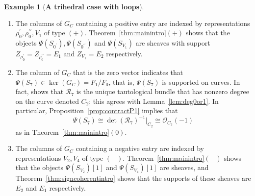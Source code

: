 \documentclass[11pt,reqno]{amsart}
\numberwithin{equation}{section}
\theoremstyle{definition}
\newtheorem{example}[theorem]{Example}
\newcommand{\0}{\operatorname{0}}
\begin{document}
\begin{example}[\textbf{A trihedral case with loops}]
 \begin{enumerate}
 \item[\ensuremath{(+)}] The columns of $G_C$ containing a positive entry are indexed by representations $\rho_{0}^\prime, \rho_{0}^{\prime\prime}, V_1$ of type \ensuremath{(+)}. Theorem~\ref{thm:mainintro}\ensuremath{(+)} shows that the objects $\Psi(S_{0^\prime}), \Psi(S_{0^{\prime\prime}})$ and $\Psi(S_{V_1})$ are sheaves with support $Z_{\rho_0^\prime}=Z_{\rho_0^{\prime\prime}}=E_1$ and $Z_{V_1}=E_2$ respectively.
 \item[\ensuremath{(0)}] The column of $G_C$ that is the zero vector indicates that $\Psi(S_7)\in \ker(G_C)=F_1/F_0$, that is, $\Psi(S_7)$ is supported on curves. In fact, \cite[Figure~11]{NolladeCelis21} shows that $\mathcal{R}_7$ is the unique tautological bundle that has nonzero degree on the curve denoted $C_2$; this agrees with Lemma~\ref{lem:deg0or1}. In particular, Proposition~\ref{prop:contractP1} implies that
 \[
 \Psi(S_7)\cong \det(\mathcal{R}_7)^{-1}\vert_{C_2}\cong\mathcal{O}_{C_2}(-1)
 \]
 as in  Theorem~\ref{thm:mainintro}\ensuremath{(0)}.
 \item[\ensuremath{(-)}]  The columns of $G_C$ containing a negative entry are indexed by representations $V_2, V_4$ of type \ensuremath{(-)}. Theorem~\ref{thm:mainintro}\ensuremath{(-)} shows that the objects $\Psi(S_{V_2})[1]$ and $\Psi(S_{V_4})[1]$ are sheaves, and Theorem~\ref{thm:signcoherentintro} shows that the supports of these sheaves are $E_2$ and $E_1$ respectively.
 \end{enumerate}
\end{example}

 
\end{document}
